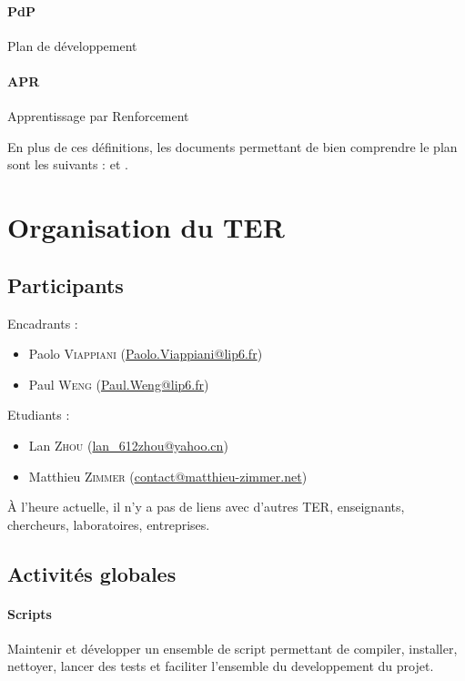 \documentclass[a4paper,12pt]{article}
\begin{document}
   \paragraph{PdP} Plan de développement
   
   \paragraph{APR} Apprentissage par Renforcement
   
  \bigskip
  En plus de ces définitions, les documents permettant de bien 
    comprendre le plan sont les suivants : \cite{PDMIA} et \cite{ReinforceLearningIntro}.
  
  \newpage 
  \section{Organisation du TER}

    \subsection{Participants}
	Encadrants :
	\begin{itemize}
		\item Paolo \textsc{Viappiani} (\href{mailto:Paolo.Viappiani@lip6.fr}{Paolo.Viappiani@lip6.fr})
		\item Paul \textsc{Weng} (\href{mailto:Paul.Weng@lip6.fr }{Paul.Weng@lip6.fr})
	\end{itemize}

	\bigskip
	Etudiants :
	\begin{itemize}
		\item Lan \textsc{Zhou} (\href{mailto:lan\_612zhou@yahoo.cn}{lan\_612zhou@yahoo.cn})
		\item Matthieu \textsc{Zimmer} (\href{mailto:contact@matthieu-zimmer.net}{contact@matthieu-zimmer.net})
	\end{itemize}

	\bigskip
	À l'heure actuelle, il n'y a pas de liens avec d'autres TER, enseignants, chercheurs,
	laboratoires, entreprises.
    
    \subsection{Activités globales}
      \paragraph{Scripts} Maintenir et développer un ensemble de script permettant de compiler, installer, nettoyer, lancer
      des tests et faciliter l'ensemble du developpement du projet.
     
\end{document}

